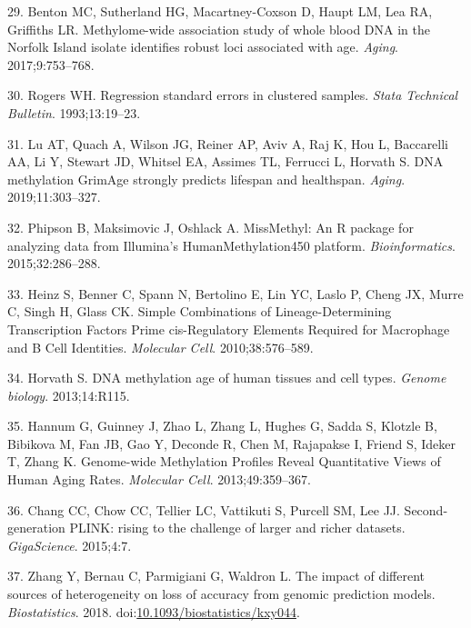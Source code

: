 \documentclass[]{article}
\begin{document}
\leavevmode\hypertarget{ref-Benton2017}{}%
29. Benton MC, Sutherland HG, Macartney-Coxson D, Haupt LM, Lea RA,
Griffiths LR. Methylome-wide association study of whole blood DNA in the
Norfolk Island isolate identifies robust loci associated with age.
\emph{Aging}. 2017;9:753--768.

\leavevmode\hypertarget{ref-Rogers1993}{}%
30. Rogers WH. Regression standard errors in clustered samples.
\emph{Stata Technical Bulletin}. 1993;13:19--23.

\leavevmode\hypertarget{ref-Lu2019}{}%
31. Lu AT, Quach A, Wilson JG, Reiner AP, Aviv A, Raj K, Hou L,
Baccarelli AA, Li Y, Stewart JD, Whitsel EA, Assimes TL, Ferrucci L,
Horvath S. DNA methylation GrimAge strongly predicts lifespan and
healthspan. \emph{Aging}. 2019;11:303--327.

\leavevmode\hypertarget{ref-Phipson2015}{}%
32. Phipson B, Maksimovic J, Oshlack A. MissMethyl: An R package for
analyzing data from Illumina's HumanMethylation450 platform.
\emph{Bioinformatics}. 2015;32:286--288.

\leavevmode\hypertarget{ref-Heinz2010}{}%
33. Heinz S, Benner C, Spann N, Bertolino E, Lin YC, Laslo P, Cheng JX,
Murre C, Singh H, Glass CK. Simple Combinations of Lineage-Determining
Transcription Factors Prime cis-Regulatory Elements Required for
Macrophage and B Cell Identities. \emph{Molecular Cell}.
2010;38:576--589.

\leavevmode\hypertarget{ref-Horvath2013}{}%
34. Horvath S. DNA methylation age of human tissues and cell types.
\emph{Genome biology}. 2013;14:R115.

\leavevmode\hypertarget{ref-Hannum2013}{}%
35. Hannum G, Guinney J, Zhao L, Zhang L, Hughes G, Sadda S, Klotzle B,
Bibikova M, Fan JB, Gao Y, Deconde R, Chen M, Rajapakse I, Friend S,
Ideker T, Zhang K. Genome-wide Methylation Profiles Reveal Quantitative
Views of Human Aging Rates. \emph{Molecular Cell}. 2013;49:359--367.

\leavevmode\hypertarget{ref-Chang2015}{}%
36. Chang CC, Chow CC, Tellier LC, Vattikuti S, Purcell SM, Lee JJ.
Second-generation PLINK: rising to the challenge of larger and richer
datasets. \emph{GigaScience}. 2015;4:7.

\leavevmode\hypertarget{ref-Zhang2018}{}%
37. Zhang Y, Bernau C, Parmigiani G, Waldron L. The impact of different
sources of heterogeneity on loss of accuracy from genomic prediction
models. \emph{Biostatistics}. 2018.
doi:\href{https://doi.org/10.1093/biostatistics/kxy044}{10.1093/biostatistics/kxy044}.
\end{document}
